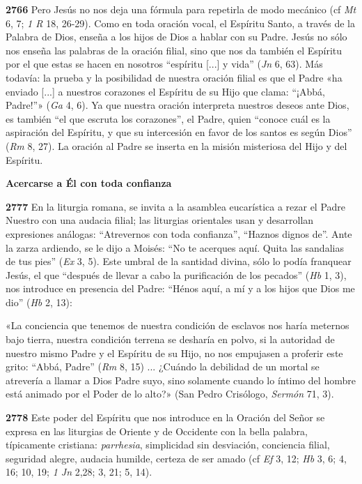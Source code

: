 \documentclass[]{article}
\begin{document}
\textbf{2766} Pero Jesús no nos deja una fórmula para repetirla de modo
mecánico (cf \emph{Mt} 6, 7; \emph{1 R} 18, 26-29). Como en toda oración
vocal, el Espíritu Santo, a través de la Palabra de Dios, enseña a los
hijos de Dios a hablar con su Padre. Jesús no sólo nos enseña las
palabras de la oración filial, sino que nos da también el Espíritu por
el que estas se hacen en nosotros ``espíritu {[}...{]} y vida''
(\emph{Jn} 6, 63). Más todavía: la prueba y la posibilidad de nuestra
oración filial es que el Padre «ha enviado {[}...{]} a nuestros
corazones el Espíritu de su Hijo que clama: ``¡Abbá, Padre!''»
(\emph{Ga} 4, 6). Ya que nuestra oración interpreta nuestros deseos ante
Dios, es también ``el que escruta los corazones'', el Padre, quien
``conoce cuál es la aspiración del Espíritu, y que su intercesión en
favor de los santos es según Dios'' (\emph{Rm} 8, 27). La oración al
Padre se inserta en la misión misteriosa del Hijo y del Espíritu.

\textbf{Acercarse a Él con toda confianza}

\textbf{2777} En la liturgia romana, se invita a la asamblea eucarística
a rezar el Padre Nuestro con una audacia filial; las liturgias
orientales usan y desarrollan expresiones análogas: ``Atrevernos con
toda confianza'', ``Haznos dignos de''. Ante la zarza ardiendo, se le
dijo a Moisés: ``No te acerques aquí. Quita las sandalias de tus pies''
(\emph{Ex} 3, 5). Este umbral de la santidad divina, sólo lo podía
franquear Jesús, el que ``después de llevar a cabo la purificación de
los pecados'' (\emph{Hb} 1, 3), nos introduce en presencia del Padre:
``Hénos aquí, a mí y a los hijos que Dios me dio'' (\emph{Hb} 2, 13):

«La conciencia que tenemos de nuestra condición de esclavos nos haría
meternos bajo tierra, nuestra condición terrena se desharía en polvo, si
la autoridad de nuestro mismo Padre y el Espíritu de su Hijo, no nos
empujasen a proferir este grito: ``Abbá, Padre'' (\emph{Rm} 8, 15) ...
¿Cuándo la debilidad de un mortal se atrevería a llamar a Dios Padre
suyo, sino solamente cuando lo íntimo del hombre está animado por el
Poder de lo alto?» (San Pedro Crisólogo, \emph{Sermón} 71, 3).

\textbf{2778} Este poder del Espíritu que nos introduce en la Oración
del Señor se expresa en las liturgias de Oriente y de Occidente con la
bella palabra, típicamente cristiana: \emph{parrhesia}, simplicidad sin
desviación, conciencia filial, seguridad alegre, audacia humilde,
certeza de ser amado (cf \emph{Ef} 3, 12; \emph{Hb} 3, 6; 4, 16; 10, 19;
\emph{1 Jn} 2,28; 3, 21; 5, 14).
\end{document}
